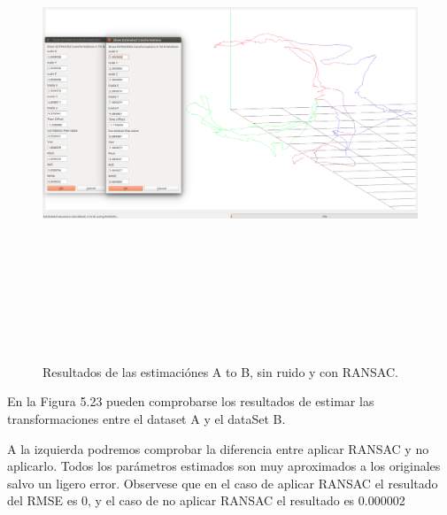 \begin{figure}[H]
\begin{center}
\label{fig:opciones de View}\includegraphics[height=14.0cm,width=18.0cm]{img/cap6/newData_EscalaTraslaRota_aB.png}
\hspace{0.5cm}

\end{center}

\caption{Resultados de las estimaciónes A to B, sin ruido y con RANSAC.}
\end{figure}
En la Figura 5.23 pueden comprobarse los resultados de estimar las transformaciones entre el dataset A y el dataSet B.

A la izquierda podremos comprobar la diferencia entre aplicar RANSAC y no aplicarlo. Todos los parámetros estimados son muy aproximados a los originales salvo un ligero error. Observese que en el caso de aplicar RANSAC el resultado del RMSE es 0, y el caso de no aplicar RANSAC el resultado es 0.000002


